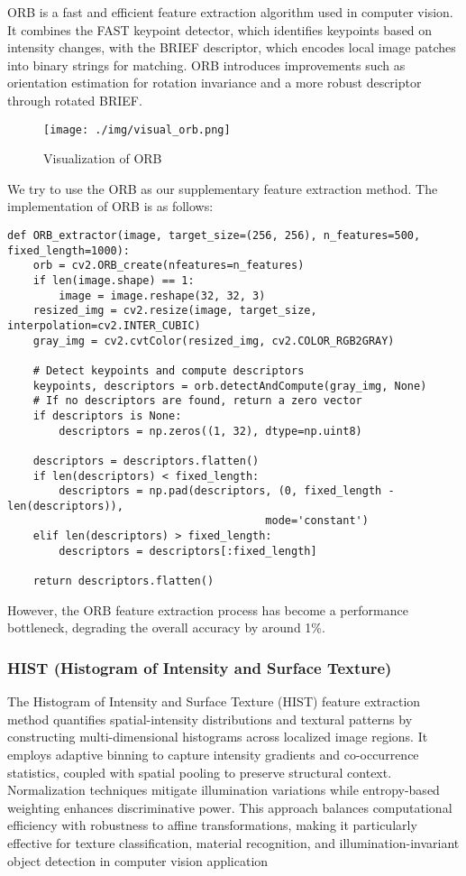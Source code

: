 \documentclass[a4paper,11pt]{article}
\begin{document}
ORB is a fast and efficient feature extraction algorithm used in computer vision. It combines the FAST keypoint detector, which identifies keypoints based on intensity changes, with the BRIEF descriptor, which encodes local image patches into binary strings for matching. ORB introduces improvements such as orientation estimation for rotation invariance and a more robust descriptor through rotated BRIEF.

\begin{figure}[H]
    \centering
    \texttt{[image: ./img/visual\_orb.png]}
    \caption[visual_hog] {Visualization of ORB}
\end{figure}

We try to use the ORB as our supplementary feature extraction method. The implementation of ORB is as follows:

\begin{verbatim}
def ORB_extractor(image, target_size=(256, 256), n_features=500, fixed_length=1000):
    orb = cv2.ORB_create(nfeatures=n_features)
    if len(image.shape) == 1:
        image = image.reshape(32, 32, 3)
    resized_img = cv2.resize(image, target_size, interpolation=cv2.INTER_CUBIC)
    gray_img = cv2.cvtColor(resized_img, cv2.COLOR_RGB2GRAY)

    # Detect keypoints and compute descriptors
    keypoints, descriptors = orb.detectAndCompute(gray_img, None)
    # If no descriptors are found, return a zero vector
    if descriptors is None:
        descriptors = np.zeros((1, 32), dtype=np.uint8)

    descriptors = descriptors.flatten()
    if len(descriptors) < fixed_length:
        descriptors = np.pad(descriptors, (0, fixed_length - len(descriptors)), 
                                        mode='constant')
    elif len(descriptors) > fixed_length:
        descriptors = descriptors[:fixed_length]

    return descriptors.flatten()
\end{verbatim}

However, the ORB feature extraction process has become a performance bottleneck, degrading the overall accuracy by around 1\%.

\subsubsection{HIST (Histogram of Intensity and Surface Texture)}

The Histogram of Intensity and Surface Texture (HIST) feature extraction method quantifies spatial-intensity distributions and textural patterns by constructing multi-dimensional histograms across localized image regions. It employs adaptive binning to capture intensity gradients and co-occurrence statistics, coupled with spatial pooling to preserve structural context. Normalization techniques mitigate illumination variations while entropy-based weighting enhances discriminative power. This approach balances computational efficiency with robustness to affine transformations, making it particularly effective for texture classification, material recognition, and illumination-invariant object detection in computer vision application
\end{document}
